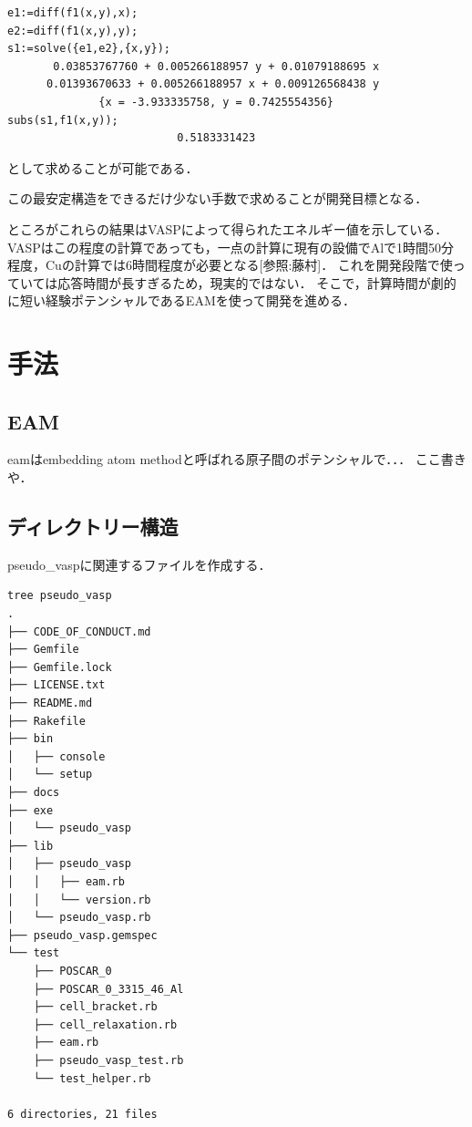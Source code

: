 \begin{verbatim}
e1:=diff(f1(x,y),x);
e2:=diff(f1(x,y),y);
s1:=solve({e1,e2},{x,y});
       0.03853767760 + 0.005266188957 y + 0.01079188695 x
      0.01393670633 + 0.005266188957 x + 0.009126568438 y
              {x = -3.933335758, y = 0.7425554356}
subs(s1,f1(x,y));
                          0.5183331423
\end{verbatim}

として求めることが可能である．

この最安定構造をできるだけ少ない手数で求めることが開発目標となる．

ところがこれらの結果はVASPによって得られたエネルギー値を示している．
VASPはこの程度の計算であっても，一点の計算に現有の設備でAlで1時間50分程度，Cuの計算では6時間程度が必要となる{[}参照:藤村{]}．
これを開発段階で使っていては応答時間が長すぎるため，現実的ではない．
そこで，計算時間が劇的に短い経験ポテンシャルであるEAMを使って開発を進める．

    \section{手法}\label{ux624bux6cd5}

\subsection{EAM}\label{eam}

eamはembedding atom methodと呼ばれる原子間のポテンシャルで．．．
ここ書きや．

    \subsection{ディレクトリー構造}\label{ux30c7ux30a3ux30ecux30afux30c8ux30eaux30fcux69cbux9020}

pseudo\_vaspに関連するファイルを作成する．

\begin{verbatim}
tree pseudo_vasp
.
├── CODE_OF_CONDUCT.md
├── Gemfile
├── Gemfile.lock
├── LICENSE.txt
├── README.md
├── Rakefile
├── bin
│   ├── console
│   └── setup
├── docs
├── exe
│   └── pseudo_vasp
├── lib
│   ├── pseudo_vasp
│   │   ├── eam.rb
│   │   └── version.rb
│   └── pseudo_vasp.rb
├── pseudo_vasp.gemspec
└── test
    ├── POSCAR_0
    ├── POSCAR_0_3315_46_Al
    ├── cell_bracket.rb
    ├── cell_relaxation.rb
    ├── eam.rb
    ├── pseudo_vasp_test.rb
    └── test_helper.rb

6 directories, 21 files
\end{verbatim}

